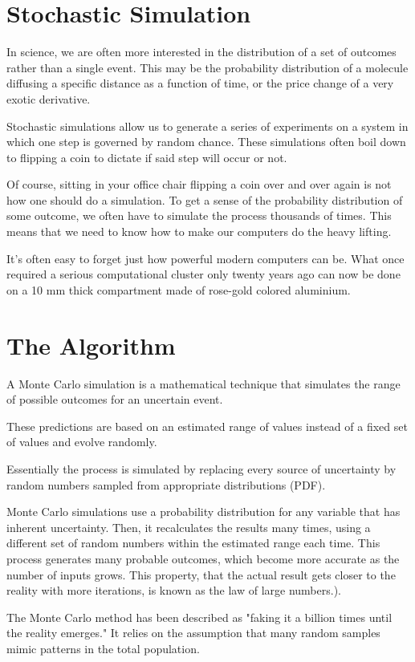 \documentclass[12pt,a4paper]{book}
\begin{document}
\section{Stochastic Simulation}
In science, we are often more interested in the distribution of a set of outcomes rather than a single event. This may be the probability distribution of a molecule diffusing a specific distance as a function of time, or the price change of a very exotic derivative.

Stochastic simulations allow us to generate a series of experiments on a system in which one step is governed by random chance. These simulations often boil down to flipping a coin to dictate if said step will occur or not.

Of course, sitting in your office chair flipping a coin over and over again is not how one should do a simulation. To get a sense of the probability distribution of some outcome, we often have to simulate the process thousands of times. This means that we need to know how to make our computers do the heavy lifting.

It's often easy to forget just how powerful modern computers can be. What once required a serious computational cluster only twenty years ago can now be done on a 10 mm thick compartment made of rose-gold colored aluminium. 

\section{The Algorithm}
A Monte Carlo simulation is a mathematical technique that simulates the range of possible outcomes for an uncertain event.

These predictions are based on an estimated range of values instead of a fixed set of values and evolve randomly.

Essentially the process is simulated by replacing every source of uncertainty by random numbers sampled from appropriate distributions (PDF). 

Monte Carlo simulations use a probability distribution for any variable that has inherent uncertainty. Then, it recalculates the results many times, using a different set of random numbers within the estimated range each time. This process generates many probable outcomes, which become more accurate as the number of inputs grows. This property, that the actual result gets closer to the reality with more iterations, is known as the law of large numbers.).

The Monte Carlo method has been described as "faking it a billion times until the reality emerges."
It relies on the assumption that many random samples mimic patterns in the total population.
\end{document}

